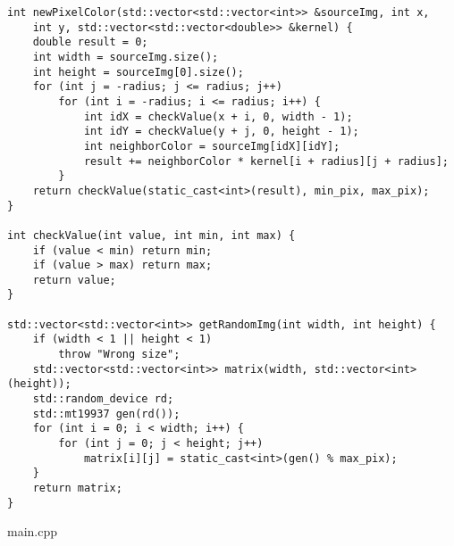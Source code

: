 \documentclass{report}
\begin{document}
\begin{lstlisting}
int newPixelColor(std::vector<std::vector<int>> &sourceImg, int x,
    int y, std::vector<std::vector<double>> &kernel) {
    double result = 0;
    int width = sourceImg.size();
    int height = sourceImg[0].size();
    for (int j = -radius; j <= radius; j++)
        for (int i = -radius; i <= radius; i++) {
            int idX = checkValue(x + i, 0, width - 1);
            int idY = checkValue(y + j, 0, height - 1);
            int neighborColor = sourceImg[idX][idY];
            result += neighborColor * kernel[i + radius][j + radius];
        }
    return checkValue(static_cast<int>(result), min_pix, max_pix);
}

int checkValue(int value, int min, int max) {
    if (value < min) return min;
    if (value > max) return max;
    return value;
}

std::vector<std::vector<int>> getRandomImg(int width, int height) {
    if (width < 1 || height < 1)
        throw "Wrong size";
    std::vector<std::vector<int>> matrix(width, std::vector<int>(height));
    std::random_device rd;
    std::mt19937 gen(rd());
    for (int i = 0; i < width; i++) {
        for (int j = 0; j < height; j++)
            matrix[i][j] = static_cast<int>(gen() % max_pix);
    }
    return matrix;
}
\end{lstlisting}
\par main.cpp
\end{document}
